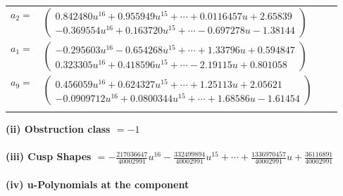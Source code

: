 \documentclass[1p]{elsarticle_modified}
\theoremstyle{definition}
\begin{document}
\begin{tabular}{m{7pt} m{180pt} m{7pt} m{180pt} }
\flushright $a_{2}=$&$\begin{pmatrix}0.842480 u^{16}+0.955949 u^{15}+\cdots+0.0116457 u+2.65839\\-0.369554 u^{16}+0.163720 u^{15}+\cdots-0.697278 u-1.38144\end{pmatrix}$ \\
\flushright $a_{1}=$&$\begin{pmatrix}-0.295603 u^{16}-0.654268 u^{15}+\cdots+1.33796 u+0.594847\\0.323305 u^{16}+0.418596 u^{15}+\cdots-2.19115 u+0.801058\end{pmatrix}$ \\
\flushright $a_{9}=$&$\begin{pmatrix}0.456059 u^{16}+0.624327 u^{15}+\cdots+1.25113 u+2.05621\\-0.0909712 u^{16}+0.0800344 u^{15}+\cdots+1.68586 u-1.61454\end{pmatrix}$\\&\end{tabular}
\flushleft \textbf{(ii) Obstruction class $= -1$}\\~\\
\flushleft \textbf{(iii) Cusp Shapes $= -\frac{217036647}{40002991} u^{16}-\frac{332499894}{40002991} u^{15}+\cdots+\frac{1336970457}{40002991} u+\frac{36116891}{40002991}$}\\~\\
\newpage\renewcommand{\arraystretch}{1}
\flushleft \textbf{(iv) u-Polynomials at the component}\newline \\
\end{document}

